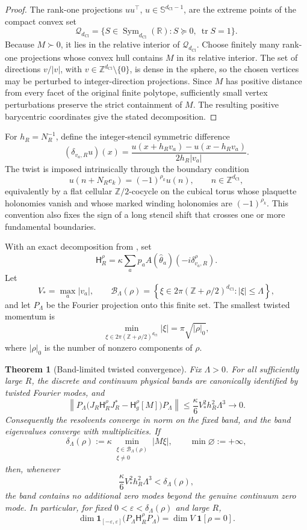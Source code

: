 \documentclass[11pt]{article}
\newtheorem{theorem}{Theorem}[section]
\theoremstyle{definition}
\theoremstyle{remark}
\newcommand{\Z}{\mathbb{Z}}
\newcommand{\R}{\mathbb{R}}
\newcommand{\Ztwo}{\mathbb{Z}/2}
\newcommand{\dCl}{d_{\mathrm{Cl}}}
\newcommand{\Sphere}{\mathbb{S}}
\newcommand{\tr}{\operatorname{tr}}
\newcommand{\Ham}{\mathsf{H}}
\begin{document}
\begin{proof}
The rank-one projections \(uu^\top\), \(u\in\Sphere^{\dCl-1}\), are the extreme
points of the compact convex set
\[
  \mathcal Q_{\dCl}
  =
  \{S\in\operatorname{Sym}_{\dCl}(\R):S\succeq0,\ \tr S=1\}.
\]
Because \(M\succ0\), it lies in the relative interior of \(\mathcal Q_{\dCl}\).
Choose finitely many rank-one projections whose convex hull contains \(M\) in
its relative interior.  The set of directions \(v/|v|\), with
\(v\in\Z^{\dCl}\setminus\{0\}\), is dense in the sphere, so the chosen vertices
may be perturbed to integer-direction projections.  Since \(M\) has positive
distance from every facet of the original finite polytope, sufficiently small
vertex perturbations preserve the strict containment of \(M\).  The resulting
positive barycentric coordinates give the stated decomposition.
\end{proof}

For \(h_R=N_R^{-1}\), define the integer-stencil symmetric difference
\[
  (\delta_{v_a,R}u)(x)
  =
  \frac{u(x+h_Rv_a)-u(x-h_Rv_a)}
       {2h_R|v_a|}.
\]
The twist is imposed intrinsically through the boundary condition
\[
  u(n+N_Re_k)=(-1)^{\rho_k}u(n),
  \qquad n\in\Z^{\dCl},
\]
equivalently by a flat cellular \(\Ztwo\)-cocycle on the cubical torus whose
plaquette holonomies vanish and whose marked winding holonomies are
\((-1)^{\rho_k}\).  This convention also fixes the sign of a long stencil shift
that crosses one or more fundamental boundaries.

With an exact decomposition from
, set
\[
  \Ham^\rho_R
  =
  \kappa\sum_a p_aA(\hat\theta_a)(-i\delta^\rho_{v_a,R}).
\]
Let
\[
  V_*=\max_a|v_a|,
  \qquad
  \mathcal B_\Lambda(\rho)
  =
  \left\{
  \xi\in2\pi(\Z+\rho/2)^{\dCl}:|\xi|\le\Lambda
  \right\},
\]
and let \(P_\Lambda\) be the Fourier projection onto this finite set.  The
smallest twisted momentum is
\[
  \min_{\xi\in2\pi(\Z+\rho/2)^{\dCl}}|\xi|
  =
  \pi\sqrt{|\rho|_0},
\]
where \(|\rho|_0\) is the number of nonzero components of \(\rho\).

\begin{theorem}[Band-limited twisted convergence]
\label{thm:marked-torus-band-limit}
Fix \(\Lambda>0\).  For all sufficiently large \(R\), the discrete and continuum
physical bands are canonically identified by twisted Fourier modes, and
\[
 \left\|
 P_\Lambda
 \bigl(J_R\Ham^\rho_RJ_R^*-\Ham^\rho_g[M]\bigr)
 P_\Lambda
 \right\|
 \le
 \frac{\kappa}{6}V_*^2h_R^2\Lambda^3
 \longrightarrow0.
\]
Consequently the resolvents converge in norm on the fixed band, and the
band eigenvalues converge with multiplicities.  If
\[
  \delta_\Lambda(\rho)
  :=
  \kappa
  \min_{\substack{\xi\in\mathcal B_\Lambda(\rho)\\\xi\ne0}}
  |M\xi|,
  \qquad \min\varnothing:=+\infty,
\]
then, whenever
\[
  \frac{\kappa}{6}V_*^2h_R^2\Lambda^3<\delta_\Lambda(\rho),
\]
the band contains no additional zero modes beyond the genuine continuum zero
mode.  In particular, for fixed
\(0<\varepsilon<\delta_\Lambda(\rho)\) and large \(R\),
\[
  \dim\mathbf1_{[-\varepsilon,\varepsilon]}
  \bigl(P_\Lambda\Ham^\rho_RP_\Lambda\bigr)
  =
  \dim V\;\mathbf1[\rho=0].
\]
\end{theorem}
\end{document}
